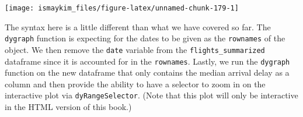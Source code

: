 \documentclass[]{tufte-book}
\begin{document}
\begin{center}\texttt{[image: ismaykim\_files/figure-latex/unnamed-chunk-179-1]} \end{center}

The syntax here is a little different than what we have covered so far.
The \texttt{dygraph} function is expecting for the dates to be given as
the \texttt{rownames} of the object. We then remove the \texttt{date}
variable from the \texttt{flights\_summarized} dataframe since it is
accounted for in the \texttt{rownames}. Lastly, we run the
\texttt{dygraph} function on the new dataframe that only contains the
median arrival delay as a column and then provide the ability to have a
selector to zoom in on the interactive plot via
\texttt{dyRangeSelector}. (Note that this plot will only be interactive
in the HTML version of this book.)

\renewcommand{\bibname}{References}

% 
% 
\end{document}
